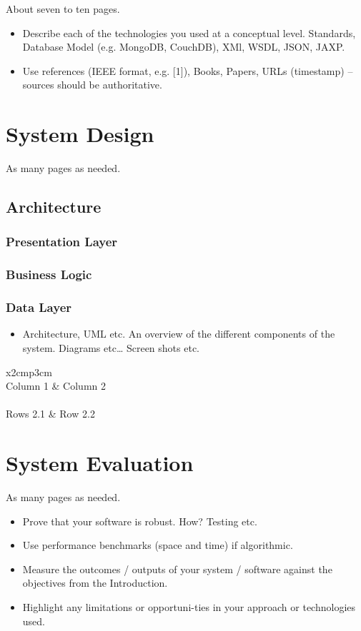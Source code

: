 About seven to ten pages.
\begin{itemize}
	\item Describe each of the technologies you used at a conceptual level. Standards, Database Model (e.g. MongoDB, CouchDB), XMl, WSDL, JSON, JAXP.
	\item Use references (IEEE format, e.g. [1]), Books, Papers, URLs (timestamp) – sources should be authoritative. 
\end{itemize}


\chapter{System Design}
As many pages as needed.
	\section{Architecture}
		\subsection{Presentation Layer}
		\subsection{Business Logic }
		\subsection{Data Layer}
\begin{itemize}
	\item Architecture, UML etc. An overview of the different components of the system. Diagrams etc… Screen shots etc.
\end{itemize}

\begin{table}[h]
	\centering
	\begin{tabular}{x{2cm}p{3cm}}
		\toprule \\
		Column 1 & Column 2 \\
		\midrule \\
		Rows 2.1 & Row 2.2 \\
		\bottomrule
	\end{tabular}
	\caption{A table.}
	\label{table:mytable}
\end{table}

\chapter{System Evaluation}
As many pages as needed.
\begin{itemize}
	\item Prove that your software is robust. How? Testing etc. 
	\item Use performance benchmarks (space and time) if algorithmic.
	\item Measure the outcomes / outputs of your system / software against the objectives from the Introduction.
	\item Highlight any limitations or opportuni-ties in your approach or technologies used.
\end{itemize}

